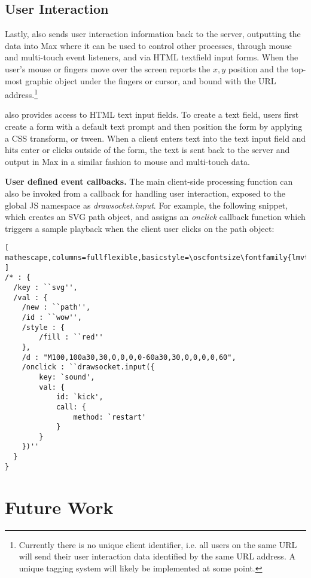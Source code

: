 \subsection{User Interaction}\label{sec:interaction}
Lastly, \drawsocket also sends user interaction information back to the server, outputting the data into Max where it can be used to control other processes, through mouse and multi-touch event listeners, and via HTML textfield input forms.
When the user's mouse or fingers move over the screen \drawsocket reports the $x,y$ position and the top-most graphic object under the fingers or cursor, and bound with the URL address.\footnote{Currently there is no unique client identifier, i.e. all users on the same URL will send their user interaction data identified by the same URL address. A unique tagging system will likely be implemented at some point.}

\drawsocket also provides access to HTML text input fields. To create a text field, users first create a form with a default text prompt and then position the form by applying a CSS transform, or tween. When a client enters text into the text input field and hits enter or clicks outside of the form, the text is sent back to the server and output in Max in a similar fashion to mouse and multi-touch data.

\medskip
\noindent
\textbf{User defined event callbacks.}
The main client-side processing function can also be invoked from a callback for handling user interaction, exposed to the global JS namespace as \textit{drawsocket.input}. For example, the following snippet, which creates an SVG path object, and assigns an \textit{onclick} callback function which triggers a sample playback when the client user clicks on the path object:

\begin{lstlisting}[ mathescape,columns=fullflexible,basicstyle=\oscfontsize\fontfamily{lmvtt}\selectfont ]
/* : {
  /key : ``svg'',
  /val : {
    /new : ``path'',
    /id : ``wow'',
    /style : {
        /fill : ``red''
    },
    /d : "M100,100a30,30,0,0,0,0-60a30,30,0,0,0,0,60",
    /onclick : ``drawsocket.input({
        key: `sound',
        val: {
            id: `kick',
            call: { 
                method: `restart' 
            }
        }
    })''
  }
}
\end{lstlisting}

%


\section{Future Work}

